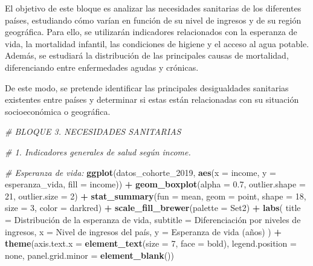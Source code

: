 \documentclass[notspecified,article,submit,moreauthors,pdftex]{Definitions/mdpi}
\newenvironment{Shaded}{\begin{snugshade}}{\end{snugshade}}
\newcommand{\AttributeTok}[1]{\textcolor[rgb]{0.13,0.29,0.53}{#1}}
\newcommand{\CommentTok}[1]{\textcolor[rgb]{0.56,0.35,0.01}{\textit{#1}}}
\newcommand{\DecValTok}[1]{\textcolor[rgb]{0.00,0.00,0.81}{#1}}
\newcommand{\FloatTok}[1]{\textcolor[rgb]{0.00,0.00,0.81}{#1}}
\newcommand{\FunctionTok}[1]{\textcolor[rgb]{0.13,0.29,0.53}{\textbf{#1}}}
\newcommand{\NormalTok}[1]{#1}
\newcommand{\SpecialCharTok}[1]{\textcolor[rgb]{0.81,0.36,0.00}{\textbf{#1}}}
\newcommand{\StringTok}[1]{\textcolor[rgb]{0.31,0.60,0.02}{#1}}
\begin{document}
El objetivo de este bloque es analizar las necesidades sanitarias de los
diferentes países, estudiando cómo varían en función de su nivel de
ingresos y de su región geográfica. Para ello, se utilizarán indicadores
relacionados con la esperanza de vida, la mortalidad infantil, las
condiciones de higiene y el acceso al agua potable. Además, se estudiará
la distribución de las principales causas de mortalidad, diferenciando
entre enfermedades agudas y crónicas.

De este modo, se pretende identificar las principales desigualdades
sanitarias existentes entre países y determinar si estas están
relacionadas con su situación socioeconómica o geográfica.

\begin{Shaded}
\begin{Highlighting}[]
\CommentTok{\# BLOQUE 3. NECESIDADES SANITARIAS}

\CommentTok{\# 1. Indicadores generales de salud según income.}

\CommentTok{\# Esperanza de vida:}
\FunctionTok{ggplot}\NormalTok{(datos\_cohorte\_2019,}
       \FunctionTok{aes}\NormalTok{(}\AttributeTok{x =}\NormalTok{ income, }\AttributeTok{y =}\NormalTok{ esperanza\_vida, }\AttributeTok{fill =}\NormalTok{ income)) }\SpecialCharTok{+}
  \FunctionTok{geom\_boxplot}\NormalTok{(}\AttributeTok{alpha =} \FloatTok{0.7}\NormalTok{, }\AttributeTok{outlier.shape =} \DecValTok{21}\NormalTok{, }\AttributeTok{outlier.size =} \DecValTok{2}\NormalTok{) }\SpecialCharTok{+}
  \FunctionTok{stat\_summary}\NormalTok{(}\AttributeTok{fun =}\NormalTok{ mean, }\AttributeTok{geom =} \StringTok{\textquotesingle{}point\textquotesingle{}}\NormalTok{,}
               \AttributeTok{shape =} \DecValTok{18}\NormalTok{, }\AttributeTok{size =} \DecValTok{3}\NormalTok{, }\AttributeTok{color =} \StringTok{\textquotesingle{}darkred\textquotesingle{}}\NormalTok{) }\SpecialCharTok{+}
  \FunctionTok{scale\_fill\_brewer}\NormalTok{(}\AttributeTok{palette =} \StringTok{\textquotesingle{}Set2\textquotesingle{}}\NormalTok{) }\SpecialCharTok{+}
  \FunctionTok{labs}\NormalTok{(}
    \AttributeTok{title =} \StringTok{\textquotesingle{}Distribución de la esperanza de vida\textquotesingle{}}\NormalTok{,}
    \AttributeTok{subtitle =} \StringTok{\textquotesingle{}Diferenciación por niveles de ingresos\textquotesingle{}}\NormalTok{,}
    \AttributeTok{x =} \StringTok{\textquotesingle{}Nivel de ingresos del país\textquotesingle{}}\NormalTok{,}
    \AttributeTok{y =} \StringTok{\textquotesingle{}Esperanza de vida (años)\textquotesingle{}}
\NormalTok{  ) }\SpecialCharTok{+}
  \FunctionTok{theme}\NormalTok{(}\AttributeTok{axis.text.x =} \FunctionTok{element\_text}\NormalTok{(}\AttributeTok{size =} \DecValTok{7}\NormalTok{, }\AttributeTok{face =} \StringTok{\textquotesingle{}bold\textquotesingle{}}\NormalTok{),}
        \AttributeTok{legend.position =} \StringTok{\textquotesingle{}none\textquotesingle{}}\NormalTok{,}
        \AttributeTok{panel.grid.minor =} \FunctionTok{element\_blank}\NormalTok{())}
\end{Highlighting}
\end{Shaded}
\end{document}
